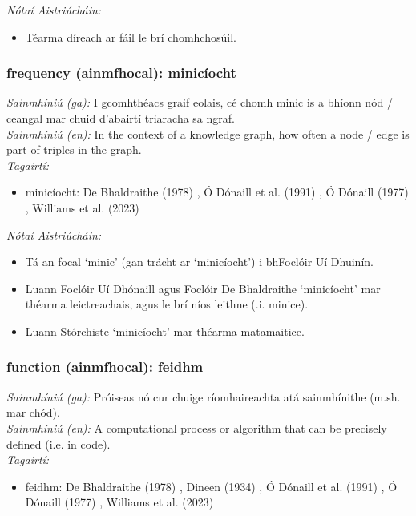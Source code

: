  \noindent \textit{Nótaí Aistriúcháin:}
\begin{itemize}
	\item Téarma díreach ar fáil le brí chomhchosúil.
\end{itemize}


\subsubsection*{frequency (ainmfhocal): minicíocht}
 \noindent \textit{Sainmhíniú (ga):} I gcomhthéacs graif eolais, cé chomh minic is a bhíonn nód / ceangal mar chuid d'abairtí triaracha sa ngraf.
\\
 \noindent \textit{Sainmhíniú (en):} In the context of a knowledge graph, how often a node / edge is part of triples in the graph.
\\
 \noindent \textit{Tagairtí:}
\begin{itemize}
	\item minicíocht: De Bhaldraithe (1978) \cite{de-bhaldraithe}, Ó Dónaill et al. (1991) \cite{focloir-beag}, Ó Dónaill (1977) \cite{odonaill}, Williams et al. (2023) \cite{storchiste}
\end{itemize}

 \noindent \textit{Nótaí Aistriúcháin:}
\begin{itemize}
	\item Tá an focal `minic' (gan trácht ar `minicíocht') i bhFoclóir Uí Dhuinín.
	\item Luann Foclóir Uí Dhónaill agus Foclóir De Bhaldraithe `minicíocht' mar théarma leictreachais, agus le brí níos leithne (.i. minice).
	\item Luann Stórchiste `minicíocht' mar théarma matamaitice.
\end{itemize}


\subsubsection*{function (ainmfhocal): feidhm}
 \noindent \textit{Sainmhíniú (ga):} Próiseas nó cur chuige ríomhaireachta atá sainmhínithe (m.sh. mar chód).
\\
 \noindent \textit{Sainmhíniú (en):} A computational process or algorithm that can be precisely defined (i.e. in code).
\\
 \noindent \textit{Tagairtí:}
\begin{itemize}
	\item feidhm: De Bhaldraithe (1978) \cite{de-bhaldraithe}, Dineen (1934) \cite{dineen}, Ó Dónaill et al. (1991) \cite{focloir-beag}, Ó Dónaill (1977) \cite{odonaill}, Williams et al. (2023) \cite{storchiste}
\end{itemize}

